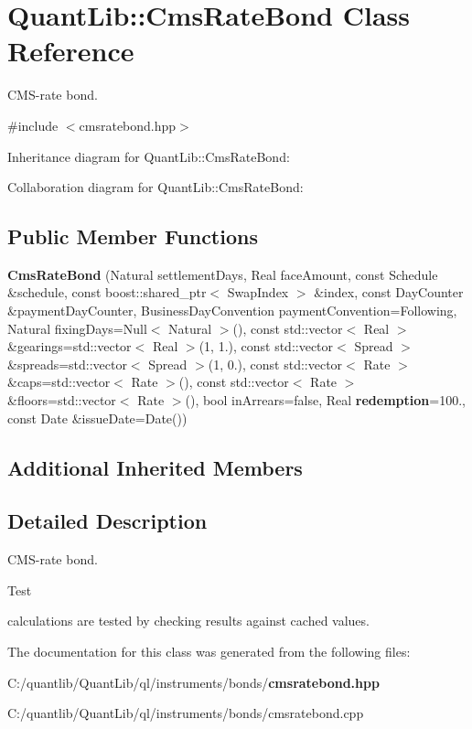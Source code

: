 \section{Quant\+Lib\+:\+:Cms\+Rate\+Bond Class Reference}
\label{class_quant_lib_1_1_cms_rate_bond}


C\+M\+S-\/rate bond.  




{\ttfamily \#include $<$cmsratebond.\+hpp$>$}



Inheritance diagram for Quant\+Lib\+:\+:Cms\+Rate\+Bond\+:


Collaboration diagram for Quant\+Lib\+:\+:Cms\+Rate\+Bond\+:
\subsection*{Public Member Functions}
\begin{DoxyCompactItemize}
\item 
{\bfseries Cms\+Rate\+Bond} (Natural settlement\+Days, Real face\+Amount, const Schedule \&schedule, const boost\+::shared\+\_\+ptr$<$ Swap\+Index $>$ \&index, const Day\+Counter \&payment\+Day\+Counter, Business\+Day\+Convention payment\+Convention=Following, Natural fixing\+Days=Null$<$ Natural $>$(), const std\+::vector$<$ Real $>$ \&gearings=std\+::vector$<$ Real $>$(1, 1.), const std\+::vector$<$ Spread $>$ \&spreads=std\+::vector$<$ Spread $>$(1, 0.), const std\+::vector$<$ Rate $>$ \&caps=std\+::vector$<$ Rate $>$(), const std\+::vector$<$ Rate $>$ \&floors=std\+::vector$<$ Rate $>$(), bool in\+Arrears=false, Real {\bf redemption}=100., const Date \&issue\+Date=Date())\label{class_quant_lib_1_1_cms_rate_bond_ac78ec0367dfbf77dbcec32142d2e1db6}

\end{DoxyCompactItemize}
\subsection*{Additional Inherited Members}


\subsection{Detailed Description}
C\+M\+S-\/rate bond. 

\begin{DoxyRefDesc}{Test}
\item[{\bf Test}]calculations are tested by checking results against cached values. \end{DoxyRefDesc}


The documentation for this class was generated from the following files\+:\begin{DoxyCompactItemize}
\item 
C\+:/quantlib/\+Quant\+Lib/ql/instruments/bonds/{\bf cmsratebond.\+hpp}\item 
C\+:/quantlib/\+Quant\+Lib/ql/instruments/bonds/cmsratebond.\+cpp\end{DoxyCompactItemize}

